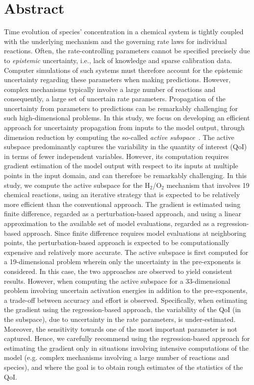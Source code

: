 \section*{Abstract}
Time evolution of species' concentration in a chemical system is tightly coupled
with the underlying mechanism and the governing rate laws for individual reactions.
Often, the rate-controlling parameters cannot be specified precisely 
due to \textit{epistemic} uncertainty, i.e., lack of knowledge and 
sparse calibration data. Computer simulations of such systems must
therefore account for the epistemic uncertainty regarding these parameters
when making predictions. However, complex mechanisms typically involve a large number of
reactions and consequently, a large set of uncertain rate parameters. Propagation of
the uncertainty from parameters to predictions can be remarkably challenging for
such high-dimensional problems. In this study, we focus on developing an efficient
approach for uncertainty propagation from inputs to the model output,
through dimension reduction by computing the
so-called
\textit{active subspace}~\cite{Constantine:2015}. The active subspace
 predominantly captures the variability in the quantity of
interest (QoI) in terms of fewer independent variables. 
However, its computation requires gradient estimation of
the model output with respect to its inputs at multiple points in the
input domain, and can therefore be
remarkably challenging. In this study, we compute the active subspace
for the H$_2$/O$_2$ mechanism that involves 19 chemical reactions,
using an iterative strategy that is expected to be relatively more efficient
than the conventional approach. 
The gradient is estimated using finite difference, regarded as a perturbation-based
approach, and using a linear approximation to the available set of model
evaluations, regarded as a regression-based approach. Since finite difference
requires model evaluations at neighboring points, the perturbation-based approach
is expected to be computationally expensive and relatively more accurate.
The active subspace is first
computed for a 19-dimensional problem wherein only the uncertainty in the pre-exponents 
is considered. In this case, the two approaches are observed to yield consistent results.
However, when computing the active subspace for a 33-dimensional problem involving
uncertain activation energies in addition to the pre-exponents, a trade-off between
accuracy and effort is observed. Specifically, when estimating the gradient using
the regression-based approach, the variability of the QoI (in the subspace),
due to uncertainty in the rate parameters, is under-estimated. Moreover, the
sensitivity towards one of the most important parameter is not captured. Hence,
we carefully recommend using the regression-based approach for estimating the
gradient only in situations involving intensive computations of the model 
(e.g. complex mechanisms involving a large number of reactions and species), and where the
goal is to obtain rough estimates of the statistics of the QoI.
